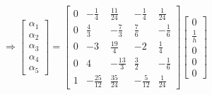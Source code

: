 \documentclass[12pt,a4paper]{report}
\begin{document}
\begin{enumerate}
$$\Rightarrow \begin{bmatrix}
\alpha_1 \\ \alpha_2 \\ \alpha_3 \\ \alpha_4 \\ \alpha_5
\end{bmatrix} = 
\begin{bmatrix}
0 & -\frac{1}{4} & \frac{11}{24} & -\frac{1}{4} & \frac{1}{24} \\
0 & \frac{4}{3} & -\frac{7}{3} & \frac{7}{6} & -\frac{1}{6} \\
0 & -3 & \frac{19}{4} & -2 & \frac{1}{4} \\
0 & 4 & -\frac{13}{3} & \frac{3}{2} & -\frac{1}{6} \\
1 & -\frac{25}{12} & \frac{35}{24} & -\frac{5}{12} & \frac{1}{24} 
\end{bmatrix}
\begin{bmatrix}
0 \\ \frac{1}{h} \\ 0 \\ 0 \\ 0
\end{bmatrix}$$
\end{enumerate}
\end{document}
